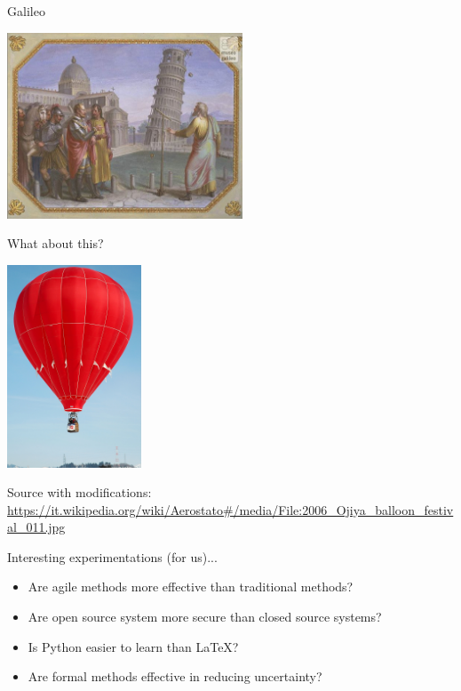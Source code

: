 \documentclass{beamer}
\begin{document}
\begin{frame}
{\centerline{Galileo}}

\begin{center}
\includegraphics[width=7cm]{A2022.IDSEPC.SperimentazioneDeduzione/Galileo.png}
\end{center} 

\end{frame}


\begin{frame}
{\centerline{What about this?}}

\begin{center}
\includegraphics[width=4cm]{A2022.IDSEPC.SperimentazioneDeduzione/Mongolfiera.jpg}
\end{center} 

\begin{center}
\tiny
Source with modifications:\\
\url{https://it.wikipedia.org/wiki/Aerostato\#/media/File:2006_Ojiya_balloon_festival_011.jpg}
\end{center} 

\end{frame}

\begin{frame}
{\centerline{Interesting experimentations (for us)...}}

\begin{itemize}
\item Are agile methods more effective than traditional methods?
\item Are open source system more secure than closed source systems?
\item Is Python easier to learn than \LaTeX?
\item Are formal methods effective in reducing uncertainty?
\end{itemize}

\end{frame}
\end{document}
